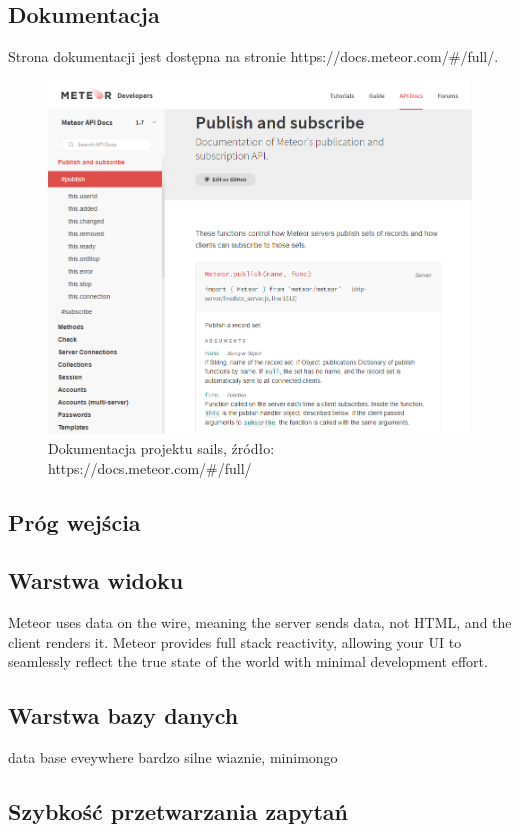 \documentclass[12pt]{report}
\begin{document}
    \subsection{Dokumentacja}
      Strona dokumentacji jest dostępna na stronie https://docs.meteor.com/\#/full/.
      \begin{figure}[!hb]
        \centering
        \includegraphics[width=\textwidth,height=\textheight,keepaspectratio]{doc_meteor.png} 
        \caption{Dokumentacja projektu sails, źródło: https://docs.meteor.com/\#/full/}
      \end{figure}

    \subsection{Próg wejścia}
    \subsection{Warstwa widoku}
      Meteor uses data on the wire, meaning the server sends data, not HTML, and the client renders it.
      Meteor provides full stack reactivity, allowing your UI to seamlessly reflect the true state of the world with minimal development effort.
    \subsection{Warstwa bazy danych}
      data base eveywhere bardzo silne wiaznie, minimongo
    \subsection{Szybkość przetwarzania zapytań}
\end{document}
